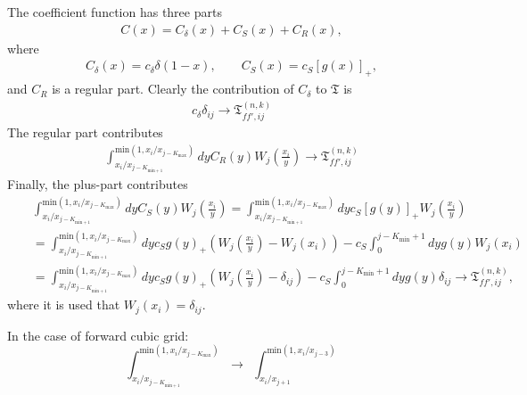 \documentclass[prd,nofootinbib,eqsecnum,final]{revtex4}
\newcommand{\nn}{\nonumber}
\renewcommand{\(}{\left(}
\renewcommand{\)}{\right)}
\renewcommand{\[}{\left[}
\renewcommand{\]}{\right]}
\newcommand{\red}[1]{{\color[rgb]{1,0,0} #1}}
\begin{document}
The coefficient function has three parts
\begin{eqnarray}
C(x)=C_\delta(x)+C_S(x)+C_R(x),
\end{eqnarray}
where
\begin{eqnarray}
C_\delta(x)=c_\delta \delta(1-x),\qquad
C_S(x)=c_S [g(x)]_+,
\end{eqnarray}
and $C_R$ is a regular part. Clearly the contribution of $C_\delta$ to $\mathfrak{T}$ is
\begin{eqnarray}
c_\delta \delta_{ij} \to \mathfrak{T}_{ff',ij}^{(n,k)}
\end{eqnarray}
The regular part contributes
\begin{eqnarray}
\int^{\text{min}(1,x_i/x_{j-K_{\text{max}}})}_{x_i/x_{j-K_{\text{min}+1}}}dy C_R(y)W_j\(\frac{x_i}{y}\)\to \mathfrak{T}_{ff',ij}^{(n,k)}
\end{eqnarray}
Finally, the plus-part contributes
\begin{eqnarray}
&&\int^{\text{min}(1,x_i/x_{j-K_{\text{max}}})}_{x_i/x_{j-K_{\text{min}+1}}}dy C_S(y)W_j\(\frac{x_i}{y}\)
=\int^{\text{min}(1,x_i/x_{j-K_{\text{max}}})}_{x_i/x_{j-K_{\text{min}+1}}}dy c_S[g(y)]_+W_j\(\frac{x_i}{y}\)
\\\nn
&&=\int^{\text{min}(1,x_i/x_{j-K_{\text{max}}})}_{x_i/x_{j-K_{\text{min}+1}}}dy c_S g(y)_+(W_j\(\frac{x_i}{y}\)-W_j(x_i))-c_S\int_0^{j-K_{\text{min}}+1} dy g(y)W_j(x_i)
\\\nn
&&=\int^{\text{min}(1,x_i/x_{j-K_{\text{max}}})}_{x_i/x_{j-K_{\text{min}+1}}}dy c_S g(y)_+(W_j\(\frac{x_i}{y}\)-\delta_{ij})-c_S\int_0^{j-K_{\text{min}}+1} dy g(y)\delta_{ij}
\to \mathfrak{T}_{ff',ij}^{(n,k)},
\end{eqnarray}
where it is used that $W_j(x_i)=\delta_{ij}$.

\red{In the case of forward cubic grid}:
$$
\int^{\text{min}(1,x_i/x_{j-K_{\text{max}}})}_{x_i/x_{j-K_{\text{min}+1}}} ~~\to~~
\int^{\text{min}(1,x_i/x_{j-3})}_{x_i/x_{j+1}}
$$
\end{document}
